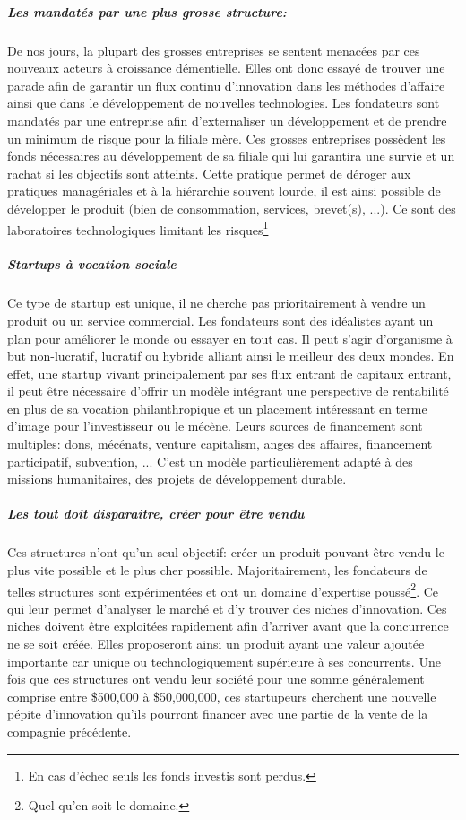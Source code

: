\documentclass[11pt, a4paper ]{article}
\begin{document}
\begin{spacing}{1.5}
			\subparagraph{Les mandatés par une plus grosse structure:} %
De nos jours, la plupart des grosses entreprises se sentent menacées par ces nouveaux acteurs à croissance démentielle. Elles ont donc essayé de trouver une parade afin de garantir un flux continu d'innovation dans les méthodes d'affaire ainsi que dans le développement de nouvelles technologies. Les fondateurs sont mandatés par une entreprise afin d'externaliser un développement et de prendre un minimum de risque pour la filiale mère. Ces grosses entreprises possèdent les fonds nécessaires au développement de sa filiale qui lui garantira une survie et un rachat si les objectifs sont atteints. Cette pratique permet de déroger aux pratiques managériales et à la hiérarchie souvent lourde, il est ainsi possible de développer le produit (bien de consommation, services, brevet(s), ...). Ce sont des laboratoires technologiques limitant les risques\footnote{En cas d’échec seuls les fonds investis sont perdus.}

			\subparagraph{Startups à vocation sociale} %
Ce type de startup est unique, il ne cherche pas prioritairement à vendre un produit ou un service commercial. Les fondateurs sont des idéalistes ayant un plan pour améliorer le monde ou essayer en tout cas.
Il peut s'agir d'organisme à but non-lucratif, lucratif ou hybride alliant ainsi le meilleur des deux mondes.
En effet, une startup vivant principalement par ses flux entrant de capitaux entrant, il peut être nécessaire d’offrir un modèle intégrant une perspective de rentabilité en plus de sa vocation philanthropique et un placement intéressant en terme d'image pour l'investisseur ou le mécène. Leurs sources de financement sont  multiples: dons, mécénats, venture capitalism, anges des affaires, financement participatif, subvention, ...
C'est un modèle particulièrement adapté à des missions humanitaires, des projets de développement durable.


			\subparagraph{Les \emph{tout doit disparaitre}, créer pour être vendu} %
Ces structures n'ont qu'un seul objectif: créer un produit pouvant être vendu le plus vite possible et le plus cher possible. Majoritairement, les fondateurs de telles structures sont expérimentées et ont un domaine d'expertise poussé\footnote{Quel qu'en soit le domaine.}. Ce qui leur permet d'analyser le marché et d'y trouver des niches d'innovation. Ces niches doivent être exploitées rapidement afin d'arriver avant que la concurrence ne se soit créée. Elles proposeront ainsi un produit ayant une valeur ajoutée importante car unique ou technologiquement supérieure à ses concurrents. Une fois que ces structures ont vendu leur société pour une somme généralement comprise entre \$500,000 à \$50,000,000, ces startupeurs cherchent une nouvelle pépite d'innovation qu'ils pourront financer avec une partie de la vente de la compagnie précédente.


\end{spacing}
\end{document}
